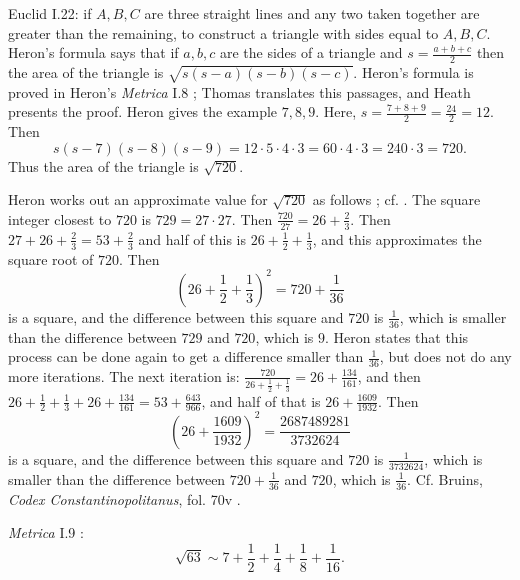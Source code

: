 \documentclass{article}
\theoremstyle{definition}
\begin{document}
Euclid I.22: if $A,B,C$ are three straight lines and any two taken together are greater
than the remaining, to construct a triangle with sides equal to $A,B,C$. 
Heron's formula says that if $a,b,c$ are the sides of a triangle and 
$s=\frac{a+b+c}{2}$ then the area of the triangle is 
$\sqrt{s(s-a)(s-b)(s-c)}$. Heron's formula is proved in 
Heron's {\em Metrica} I.8 \cite[pp.~18--25]{heronisIII};
Thomas \cite[pp.~470--477]{thomasII} translates this passages, and
Heath \cite[pp.~321--323]{HGMII} presents the proof. Heron gives the example
$7,8,9$. Here, $s=\frac{7+8+9}{2}=\frac{24}{2}=12$. Then
\[
s(s-7)(s-8)(s-9) = 12 \cdot 5 \cdot 4 \cdot 3 = 60 \cdot 4 \cdot 3 = 240 \cdot 3 = 720.
\]
Thus the area of the triangle is $\sqrt{720}$. 

Heron works out an approximate value for $\sqrt{720}$ as follows \cite[pp.~323--326]{HGMII}; cf. \cite{metrica}. The square integer closest to $720$ is $729=27 \cdot 27$. 
Then $\frac{720}{27}=26+\frac{2}{3}$. Then
$27+26+\frac{2}{3}=53+\frac{2}{3}$ and half of this is $26+\frac{1}{2}+\frac{1}{3}$, and this approximates
the square root of $720$. Then
\[
\left( 26+\frac{1}{2}+\frac{1}{3} \right)^2 = 720+\frac{1}{36}
\]
 is a square, and the difference between this square and $720$
is $\frac{1}{36}$, which is smaller than the difference between $729$ and $720$, which is $9$. 
Heron states that this process can be done again to get a difference smaller than $\frac{1}{36}$, but does not do any more iterations.
The next iteration is: $\frac{720}{26+\frac{1}{2}+\frac{1}{3}} =26+\frac{134}{161}$, and then
$26+\frac{1}{2}+\frac{1}{3}+26+\frac{134}{161}=53+\frac{643}{966}$, and half of that is
$26+\frac{1609}{1932}$. Then
\[
\left(26+\frac{1609}{1932}\right)^2 =\frac{2687489281}{3732624}
\]
is a square, and the difference between this square and $720$ is $\frac{1}{3732624}$, which is smaller than the difference
between $720+\frac{1}{36}$ and $720$, which is $\frac{1}{36}$. Cf. 
Bruins, {\em Codex Constantinopolitanus}, fol. 70v \cite[p.~189]{constantinopolitanus}.


{\em Metrica} I.9 \cite[pp.~27--29]{heronisIII}:
\[
\sqrt{63} \sim 7+\frac{1}{2}+\frac{1}{4}+\frac{1}{8}+\frac{1}{16}.
\]
\end{document}

